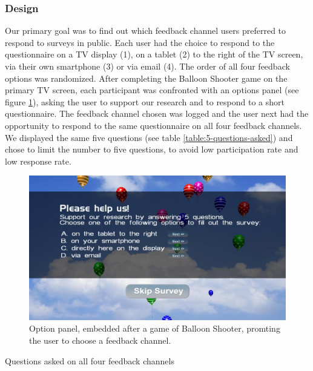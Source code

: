 	\subsubsection{Design}
	\label{chapter:field-study:design}

	Our primary goal was to find out which feedback channel users preferred to respond to surveys in public. Each user had the choice to respond to the questionnaire on a TV display (1), on a tablet (2) to the right of the TV screen, via their own smartphone (3) or via email (4). The order of all four feedback options was randomized.
	After completing the Balloon Shooter game on the primary TV screen, each participant was confronted with an options panel (see figure \ref{fig:5-feedback-options}), asking the user to support our research and to respond to a short questionnaire. The feedback channel chosen was logged and the user next had the opportunity to respond to the same questionnaire on all four feedback channels. 
	We displayed the same five questions (see table \ref{table:5-questions-asked}) and chose to limit the number to five questions, to avoid low participation rate and low response rate.

	\begin{figure}
	    \begin{center}
			\includegraphics[width=.65\columnwidth]{img/screenshots/balloon-game/options-overview.jpg}
	    \end{center}
	 \caption[Feedback Channel: Option Panel]{Option panel, embedded after a game of Balloon Shooter, promting the user to choose a feedback channel.}
	 \label{fig:5-feedback-options}
	\end{figure}

	\begin{table}[h]
		\label{table:5-questions-asked}
		\small
		\center
		
		\caption[Questions asked]{Questions asked on all four feedback channels}
	\end{table}

